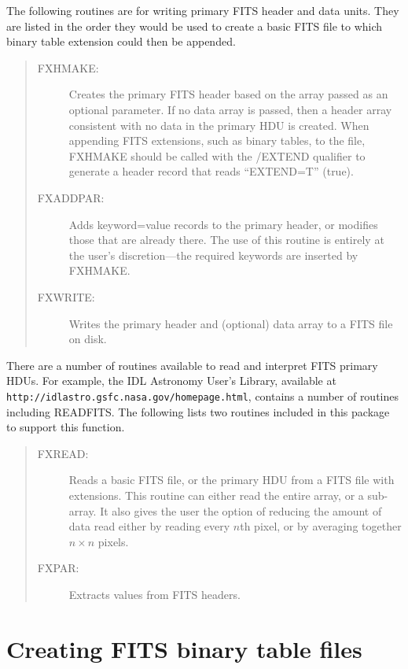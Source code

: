 The following routines are for writing primary FITS header and data units.
They are listed in the order they would be used to create a basic FITS file to
which binary table extension could then be appended.
\begin{quote}
\begin{description}
\item[FXHMAKE:]
Creates the primary FITS header based on the array passed as an optional
parameter.  If no data array is passed, then a header array consistent with no
data in the primary HDU is created.  When appending FITS extensions, such as
binary tables, to the file, FXHMAKE should be called with the /EXTEND qualifier
to generate a header record that reads ``EXTEND=T'' (true).
\item[FXADDPAR:]
Adds keyword=value records to the primary header, or modifies those that are
already there.  The use of this routine is entirely at the user's
discretion---the required keywords are inserted by FXHMAKE.
\item[FXWRITE:]
Writes the primary header and (optional) data array to a FITS file on disk.
\end{description}
\end{quote}

There are a number of routines available to read and interpret FITS primary
HDUs.  For example, the IDL Astronomy User's Library, available at \\
{\tt http://idlastro.gsfc.nasa.gov/homepage.html}, contains a number of routines including
READFITS\@.  The following lists two routines included in this package to
support this function.
\begin{quote}
\begin{description}
\item[FXREAD:]
Reads a basic FITS file, or the primary HDU from a FITS file with extensions.
This routine can either read the entire array, or a sub-array.  It also gives
the user the option of reducing the amount of data read either by reading every
$n$th pixel, or by averaging together \mbox{$n \times n$} pixels.
\item[FXPAR:]
Extracts values from FITS headers.
\end{description}
\end{quote}

\section{Creating FITS binary table files}
\label{creating}

